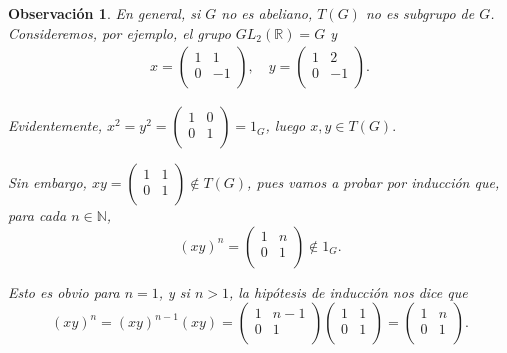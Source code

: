 \documentclass[12pt]{article}
\newtheorem{observation}{Observación}[theorem]
\begin{document}
\begin{observation}En general, si $G$ no es abeliano, $T(G)$ no es subgrupo de $G$. Consideremos, por ejemplo, el grupo $GL_2(\mathbb{R}) = G$ y \begin{align*} x=
    \begin{pmatrix}
        1 & 1 \\
        0 & -1 \\
    \end{pmatrix}, \quad y= \begin{pmatrix}
        1 & 2 \\
        0 & -1 \\
    \end{pmatrix}.
\end{align*}


Evidentemente, $x^2 = y^2 = \begin{pmatrix}
        1 & 0 \\
        0 & 1 \\
    \end{pmatrix} = 1_G$, luego $x,y \in T(G).$

Sin embargo, $xy = \begin{pmatrix}
        1 & 1 \\
        0 & 1 \\
    \end{pmatrix} \notin T(G)$, pues vamos a probar por inducción que, para cada $n \in \mathbb{N}$, $$(xy)^n = \begin{pmatrix}
        1 & n \\
        0 & 1 \\
    \end{pmatrix} \notin 1_G.$$

Esto es obvio para $n=1$, y si $n>1$, la hipótesis de inducción nos dice que $$(xy)^n = (xy)^{n-1} (xy) = \begin{pmatrix}
        1 & n-1 \\
        0 & 1 \\
    \end{pmatrix} \begin{pmatrix}
        1 & 1 \\
        0 & 1 \\
    \end{pmatrix} = \begin{pmatrix}
        1 & n \\
        0 & 1 \\
    \end{pmatrix}.$$
\end{observation}
\end{document}
